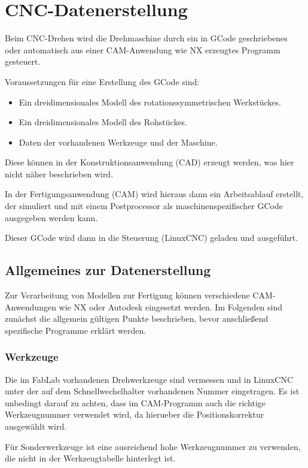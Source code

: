 \documentclass{\basedir/fablab-document}
\begin{document}
\section{CNC-Datenerstellung}

Beim CNC-Drehen wird die Drehmaschine durch ein in GCode geschriebenes oder automatisch aus einer CAM-Anwendung wie NX erzeugtes Programm gesteuert.

Voraussetzungen für eine Erstellung des GCode sind:
\begin{itemize}
	\item Ein dreidimensionales Modell des rotationssymmetrischen Werkstückes.
	\item Ein dreidimensionales Modell des Rohstückes.
	\item Daten der vorhandenen Werkzeuge und der Maschine.
\end{itemize}
Diese können in der Konstruktionsanwendung (CAD) erzeugt werden, was hier nicht näher beschrieben wird.

In der Fertigungsanwendung (CAM) wird hieraus dann ein Arbeitsablauf erstellt, der simuliert und mit einem Postprocessor als maschinenspezifischer GCode ausgegeben werden kann.

Dieser GCode wird dann in die Steuerung (LinuxCNC) geladen und ausgeführt.

\subsection{Allgemeines zur Datenerstellung}

Zur Verarbeitung von Modellen zur Fertigung können verschiedene CAM-Anwendungen wie NX oder Autodesk eingesetzt werden. Im Folgenden sind zunächst die allgemein gültigen Punkte beschrieben, bevor anschließend spezifische Programme erklärt werden.

\subsubsection{Werkzeuge}

Die im FabLab vorhandenen Drehwerkzeuge sind vermessen und in LinuxCNC unter der auf dem Schnellwechelhalter vorhandenen Nummer eingetragen. Es ist unbedingt darauf zu achten, dass im CAM-Programm auch die richtige Werkzeugnummer verwendet wird, da hierueber die Positionskorrektur ausgewählt wird.

Für Sonderwerkzeuge ist eine ausreichend hohe Werkzeugnummer zu verwenden, die nicht in der Werkzeugtabelle hinterlegt ist.
\end{document}
